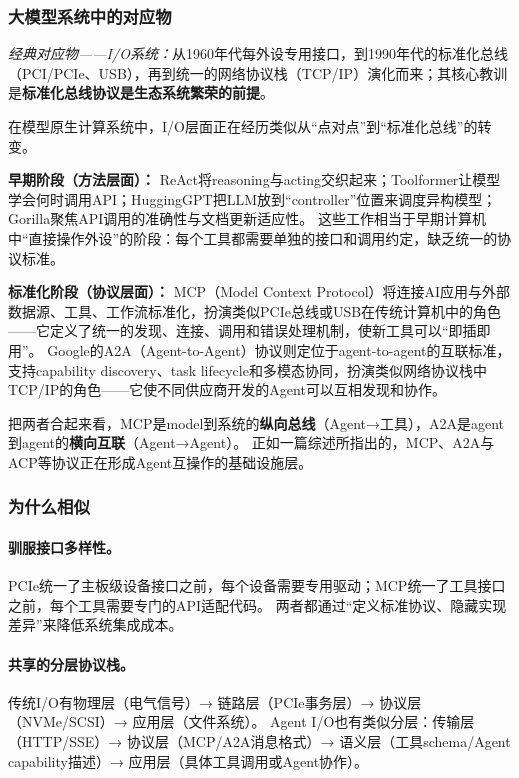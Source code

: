 \subsubsection{大模型系统中的对应物}

\textit{经典对应物——I/O系统：}从1960年代每外设专用接口，到1990年代的标准化总线（PCI/PCIe、USB），再到统一的网络协议栈（TCP/IP）演化而来；其核心教训是\textbf{标准化总线协议是生态系统繁荣的前提}。

在模型原生计算系统中，I/O层面正在经历类似从``点对点''到``标准化总线''的转变。

\textbf{早期阶段（方法层面）：}
ReAct将reasoning与acting交织起来\cite{yao2023react}；Toolformer让模型学会何时调用API\cite{schick2023toolformer}；HuggingGPT把LLM放到``controller''位置来调度异构模型\cite{hugginggpt2023}；Gorilla聚焦API调用的准确性与文档更新适应性\cite{patil2024gorilla}。
这些工作相当于早期计算机中``直接操作外设''的阶段：每个工具都需要单独的接口和调用约定，缺乏统一的协议标准。

\textbf{标准化阶段（协议层面）：}
MCP（Model Context Protocol）将连接AI应用与外部数据源、工具、工作流标准化\cite{mcp_intro_2026}，扮演类似PCIe总线或USB在传统计算机中的角色——它定义了统一的发现、连接、调用和错误处理机制，使新工具可以``即插即用''。
Google的A2A（Agent-to-Agent）协议则定位于agent-to-agent的互联标准\cite{google_a2a_2025}，支持capability discovery、task lifecycle和多模态协同，扮演类似网络协议栈中TCP/IP的角色——它使不同供应商开发的Agent可以互相发现和协作。

把两者合起来看，MCP是model到系统的\textbf{纵向总线}（Agent→工具），A2A是agent到agent的\textbf{横向互联}（Agent→Agent）。
正如一篇综述所指出的，MCP、A2A与ACP等协议正在形成Agent互操作的基础设施层\cite{agentprotocols2025}。

\subsubsection{为什么相似}

\paragraph{驯服接口多样性。}
PCIe统一了主板级设备接口之前，每个设备需要专用驱动；MCP统一了工具接口之前，每个工具需要专门的API适配代码。
两者都通过``定义标准协议、隐藏实现差异''来降低系统集成成本。

\paragraph{共享的分层协议栈。}
传统I/O有物理层（电气信号）→ 链路层（PCIe事务层）→ 协议层（NVMe/SCSI）→ 应用层（文件系统）。
Agent I/O也有类似分层：传输层（HTTP/SSE）→ 协议层（MCP/A2A消息格式）→ 语义层（工具schema/Agent capability描述）→ 应用层（具体工具调用或Agent协作）。

